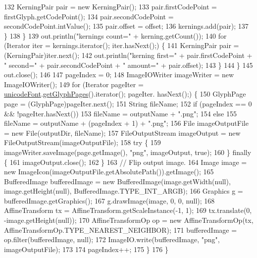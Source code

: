 \begin{DoxyCode}
132                     KerningPair pair = \textcolor{keyword}{new} KerningPair();
133                     pair.firstCodePoint = firstGlyph.getCodePoint();
134                     pair.secondCodePoint = secondCodePoint.intValue();
135                     pair.offset = offset;
136                     kernings.add(pair);
137                 \}
138             \}
139             out.println(\textcolor{stringliteral}{"kernings count="} + kerning.getCount());
140             \textcolor{keywordflow}{for} (Iterator iter = kernings.iterator(); iter.hasNext();) \{
141                 KerningPair pair = (KerningPair)iter.next();
142                 out.println(\textcolor{stringliteral}{"kerning first="} + pair.firstCodePoint + \textcolor{stringliteral}{"  second="} + pair.secondCodePoint + \textcolor{stringliteral}{"
        amount="} + pair.offset);
143             \}
144         \}
145         out.close();
146 
147         pageIndex = 0;
148         ImageIOWriter imageWriter = \textcolor{keyword}{new} ImageIOWriter();
149         \textcolor{keywordflow}{for} (Iterator pageIter = \mbox{\hyperlink{classorg_1_1newdawn_1_1slick_1_1tools_1_1hiero_1_1_b_m_font_util_aabb529febc55852008fc0d4436186dd3}{unicodeFont}}.\mbox{\hyperlink{classorg_1_1newdawn_1_1slick_1_1_unicode_font_a04594e2bc110dd31237e54caea2cfb78}{getGlyphPages}}().iterator(); pageIter.
      hasNext();) \{
150             GlyphPage page = (GlyphPage)pageIter.next();
151             String fileName;
152             \textcolor{keywordflow}{if} (pageIndex == 0 && !pageIter.hasNext())
153                 fileName = outputName + \textcolor{stringliteral}{".png"};
154             \textcolor{keywordflow}{else}
155                 fileName = outputName + (pageIndex + 1) + \textcolor{stringliteral}{".png"};
156             File imageOutputFile = \textcolor{keyword}{new} File(outputDir, fileName);
157             FileOutputStream imageOutput = \textcolor{keyword}{new} FileOutputStream(imageOutputFile);
158             \textcolor{keywordflow}{try} \{
159                 imageWriter.saveImage(page.getImage(), \textcolor{stringliteral}{"png"}, imageOutput, \textcolor{keyword}{true});
160             \} \textcolor{keywordflow}{finally} \{
161                 imageOutput.close();
162             \}
163             \textcolor{comment}{// Flip output image.}
164             Image image = \textcolor{keyword}{new} ImageIcon(imageOutputFile.getAbsolutePath()).getImage();
165             BufferedImage bufferedImage = \textcolor{keyword}{new} BufferedImage(image.getWidth(null), image.getHeight(null), 
      BufferedImage.TYPE\_INT\_ARGB);
166             Graphics g = bufferedImage.getGraphics();
167             g.drawImage(image, 0, 0, null);
168             AffineTransform tx = AffineTransform.getScaleInstance(-1, 1);
169             tx.translate(0, -image.getHeight(null));
170             AffineTransformOp op = \textcolor{keyword}{new} AffineTransformOp(tx, AffineTransformOp.TYPE\_NEAREST\_NEIGHBOR);
171             bufferedImage = op.filter(bufferedImage, null);
172             ImageIO.write(bufferedImage, \textcolor{stringliteral}{"png"}, imageOutputFile);
173 
174             pageIndex++;
175         \}
176     \}
\end{DoxyCode}


